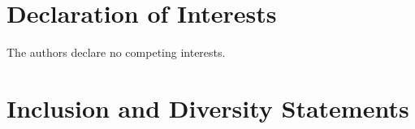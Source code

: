 \section*{Declaration of Interests}

The authors declare no competing interests.

\section*{Inclusion and Diversity Statements}
